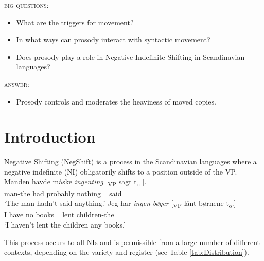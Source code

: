 \documentclass[12pt, letterpaper]{article}
\begin{document}
\begin{tcolorbox}[width=\linewidth]
\textsc{big questions}:
\begin{itemize}
	\item What are the triggers for movement?
	\item In what ways can prosody interact with syntactic movement?
	\item Does prosody play a role in Negative Indefinite Shifting in Scandinavian languages?
\end{itemize}
\textsc{answer:}
\begin{itemize}
	\item Prosody controls and moderates the heaviness of moved copies. 
\end{itemize}
\end{tcolorbox}
\section{Introduction} \label{sec:NEGSHIFT}
\ea Negative Shifting (NegShift) is a process in the Scandinavian languages where a negative indefinite (NI) obligatorily shifts to a position outside of the VP.
	\ea
	\gll Manden havde måske \textit{ingenting} [\textsubscript{VP} sagt t\textsubscript{o} ].\\
	man-the had probably nothing ~ said\\
	\glt `The man hadn't said anything.'
	\ex 
	\gll Jeg har \textit{ingen} \textit{bøger} [\textsubscript{VP} lånt børnene t\textsubscript{o}.]\\
	I have no books ~ lent children-the\\
	\glt `I haven't lent the children any books.'
	\z

\ex This process occurs to all NIs and is permissible from a large number of different contexts, depending on the variety and register (see Table \ref{tab:Distribution}). 
\end{document}
